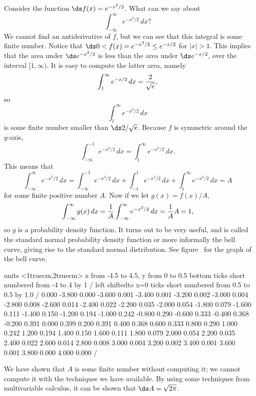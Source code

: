 \begin{example} \relax
\label{exam:normal distribution}
Consider the function $\ds f(x) = e^{-x^2/2}$. What can we say about 
$$\int_{-\infty }^\infty e^{-x^2/2}\,dx?$$ 
We cannot find an antiderivative of $f$, but we can see that this
integral is some finite number.
Notice that $\ds 0< f(x) = e^{-x^2/2} \leq e^{-x/2}$ for
$|x| > 1$. This implies that the area under $\ds e^{-x^2/2}$ is less
than the area under $\ds e^{-x/2}$, over the interval $[1,\infty)$.
It is easy to compute the latter area, namely
$$\int_1^\infty e^{-x/2}\,dx = {2\over\sqrt{e}},$$
so 
$$\int_1^\infty e^{-x^2/2}\,dx$$
is some finite number smaller than $\ds 2/\sqrt{e}$.
Because $f$ is symmetric around the $y$-axis,
$$\int_{-\infty }^{-1} e^{-x^2/2}\,dx=\int_1^\infty e^{-x^2/2}\,dx.$$
This means that 
$$
  \int_{-\infty }^\infty e^{-x^2/2}\,dx
  =\int_{-\infty}^{-1}
  e^{-x^2/2}\,dx + \int_{-1}^1 e^{-x^2/2}\,dx + \int_1^\infty
  e^{-x^2/2}\,dx = A
$$
for some finite positive number $A$.
Now if we let $g(x) = f(x)/A$,
$$
  \int_{-\infty }^\infty g(x)\,dx =
  {1\over A}\int_{-\infty }^\infty e^{-x^2/2}\,dx = 
  {1\over A} A = 1,
$$
so $g$ is a probability density function. It turns out to be very
useful, and is called the {\dfont standard normal probability density
function\/} or
more informally the {\dfont bell curve}, giving rise
to the {\dfont standard normal distribution}.  See figure~ for the graph
of the bell curve.
\end{example}

\figure
\vbox{\beginpicture
\normalgraphs
\ninepoint
\setcoordinatesystem units <1truecm,2truecm>
\setplotarea x from -4.5 to 4.5, y from 0 to 0.5
\axis bottom ticks short numbered from -4 to 4 by 1 /
\axis left shiftedto x=0 ticks short numbered from 0.5 to 0.5 by 1.0 /
\setquadratic
{} 0.000 -3.800 0.000 -3.600 0.001 -3.400 0.001 -3.200 0.002 
-3.000 0.004 -2.800 0.008 -2.600 0.014 -2.400 0.022 -2.200 0.035 
-2.000 0.054 -1.800 0.079 -1.600 0.111 -1.400 0.150 -1.200 0.194 
-1.000 0.242 -0.800 0.290 -0.600 0.333 -0.400 0.368 -0.200 0.391 
0.000 0.399 0.200 0.391 0.400 0.368 0.600 0.333 0.800 0.290 
1.000 0.242 1.200 0.194 1.400 0.150 1.600 0.111 1.800 0.079 
2.000 0.054 2.200 0.035 2.400 0.022 2.600 0.014 2.800 0.008 
3.000 0.004 3.200 0.002 3.400 0.001 3.600 0.001 3.800 0.000 
4.000 0.000 /
\endpicture}

We have shown that $A$ is some finite number without computing it; we
cannot compute it with the techniques we have available. By using some
techniques from multivariable calculus, it can be shown that
$\ds A=\sqrt{2\pi}$. 


